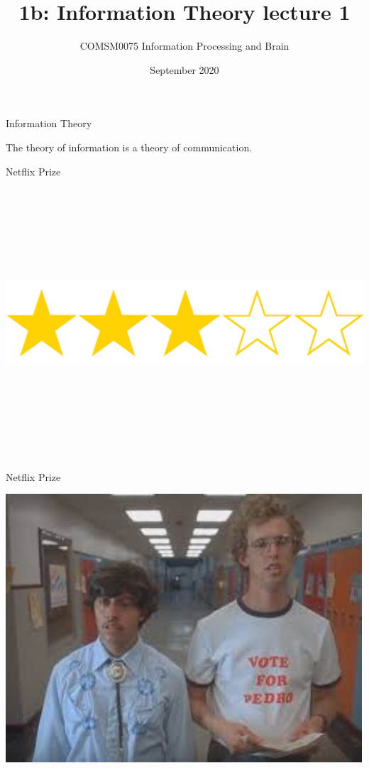 \documentclass{beamer}
\title[1b: Information Theory lecture 1]{1b: Information Theory lecture 1}
\author{COMSM0075 Information Processing and Brain}
\institute{\texttt{comsm0075.github.io}}
\date{September 2020}
\begin{document}
\maketitle


\begin{frame}{Information Theory}
  
The theory of information is a theory of communication.
  
\end{frame}


\begin{frame}{Netflix Prize}
  \begin{center}
    \includegraphics[height=10cm]{stars.png}
  \end{center}
\end{frame}


\begin{frame}{Netflix Prize}
  \begin{center}
    \includegraphics[height=10cm]{napoleon.jpg}
  \end{center}
\end{frame}
\end{document}
